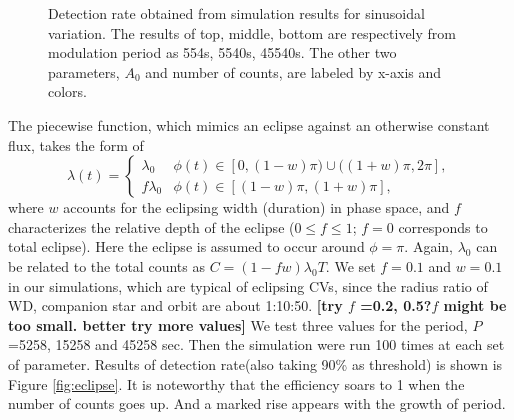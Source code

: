 \documentclass[twoside,twocolumn]{aastex63}
\begin{document}
\begin{figure}[htbp]
\caption{Detection rate obtained from simulation results for sinusoidal variation. The results of top, middle, bottom are respectively from modulation period as 554s, 5540s, 45540s. The other two parameters, $A_{0}$ and number of counts, are labeled by x-axis and colors. \label{fig:detection}}
\end{figure}

The piecewise function, which mimics an eclipse against an otherwise constant flux, takes the form of
\begin{equation}
\lambda(t)=
\begin{cases}
\lambda_0 & \text{$\phi(t) \in[0,(1-w)\pi)\cup ((1+w)\pi,2\pi]$},\\
f\lambda_0 & \text{$\phi(t) \in[(1-w)\pi,(1+w)\pi]$},
\end{cases}	
\end{equation}
where $w$ accounts for the eclipsing width (duration) in phase space, and $f$ characterizes the relative depth of the eclipse ($0\leq f \leq 1$; $f = 0$ corresponds to total eclipse). Here the eclipse is assumed to occur around $\phi = \pi$. 
Again, $\lambda_0$ can be related to the total counts as $C=(1-fw)\lambda_0T$.
We set $f=0.1$ and $w=0.1$ in our simulations, which are typical of eclipsing CVs, since the radius ratio of WD, companion star and orbit are about 1:10:50. {\bf [try $f$ =0.2, 0.5?$f$ might be too small. better try more values]}
We test three values for the period, $P$=5258, 15258 and 45258 sec. 
Then the simulation were run 100 times at each set of parameter. Results of detection rate(also taking 90\% as threshold) is shown is Figure \ref{fig:eclipse}. It is noteworthy that the efficiency soars to 1 when the number of counts goes up. And a marked rise appears with the growth of period.
 
\end{document}
